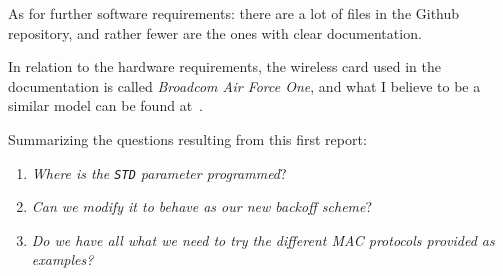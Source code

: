 As for further software requirements: there are a lot of files in the Github repository, and rather fewer are the ones with clear documentation.

In relation to the hardware requirements, the wireless card used in the documentation is called \emph{Broadcom Air Force One}, and what I believe to be a similar model can be found at~\cite{card}. 

Summarizing the questions resulting from this first report:

\begin{enumerate}
	\item \emph{Where is the \texttt{STD} parameter programmed}?
	\item \emph{Can we modify it to behave as our new backoff scheme}?
	\item \emph{Do we have all what we need to try the different MAC protocols provided as examples?}
\end{enumerate}

